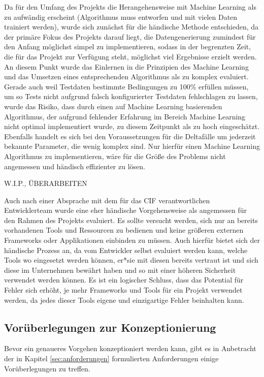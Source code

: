 Da für den Umfang des Projekts die Herangehensweise mit Machine Learning als zu aufwändig erscheint (Algorithmus muss entworfen und mit vielen Daten trainiert werden), wurde sich zunächst für die händische Methode entschieden, da der primäre Fokus des Projekts darauf liegt, die Datengenerierung zumindest für den Anfang möglichst simpel zu implementieren, sodass in der begrenzten Zeit, die für das Projekt zur Verfügung steht, möglichst viel Ergebnisse erzielt werden. An diesem Punkt wurde das Einlernen in die Prinzipien des Machine Learning und das Umsetzen eines entsprechenden Algorithmus als zu komplex evaluiert. Gerade auch weil Testdaten bestimmte Bedingungen zu 100\% erfüllen müssen, um so Tests nicht aufgrund falsch konfigurierter Testdaten fehlschlagen zu lassen, wurde das Risiko, dass durch einen auf Machine Learning basierenden Algorithmus, der aufgrund fehlender Erfahrung im Bereich Machine Learning nicht optimal implementiert wurde, zu diesem Zeitpunkt als zu hoch eingeschätzt. Ebenfalls handelt es sich bei den Voraussetzungen für die Deltafälle um jederzeit bekannte Parameter, die wenig komplex sind. Nur hierfür einen Machine Learning Algorithmus zu implementieren, wäre für die Größe des Problems nicht angemessen und händisch effizienter zu lösen.

W.I.P., ÜBERARBEITEN

Auch nach einer Absprache mit dem für das \ac{CIF} verantwortlichen Entwicklerteam wurde eine eher händische Vorgehensweise als angemessen für den Rahmen des Projekts evaluiert. Es sollte versucht werden, sich nur an bereits vorhandenen Tools und Ressourcen zu bedienen und keine größeren externen Frameworks oder Applikationen einbinden zu müssen. Auch hierfür bietet sich der händische Prozess an, da vom Entwickler selbst evaluiert werden kann, welche Tools wo eingesetzt werden können, er*sie mit diesen bereits vertraut ist und sich diese im Unternehmen bewährt haben und so mit einer höheren Sicherheit verwendet werden können. Es ist ein logischer Schluss, dass das Potential für Fehler sich erhöht, je mehr Frameworks und Tools für ein Projekt verwendet werden, da jedes dieser Tools eigene und einzigartige Fehler beinhalten kann.

\subsection{Vorüberlegungen zur Konzeptionierung}\label{subsec:vorueberlegungen}
Bevor ein genaueres Vorgehen konzeptioniert werden kann, gibt es in Anbetracht der in Kapitel \ref{sec:anforderungen} formulierten Anforderungen einige Vorüberlegungen zu treffen.

